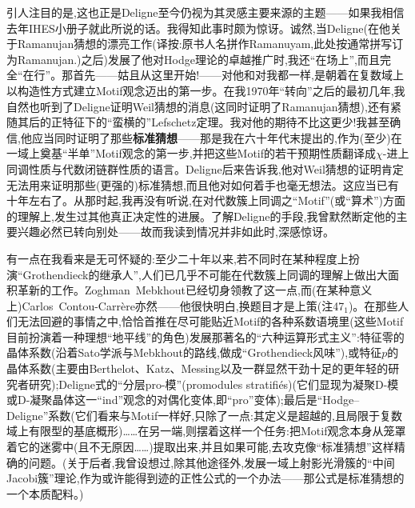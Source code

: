 引人注目的是,这也正是Deligne至今仍视为其灵感主要来源的主题——如果我相信去年IHES小册子就此所说的话。我得知此事时颇为惊讶。诚然,当Deligne(在他关于Ramanujan猜想的漂亮工作(译按:原书人名拼作Ramanuyam,此处按通常拼写订为Ramanujan.)之后)发展了他对Hodge理论的卓越推广时,我还“在场上”,而且完全“在行”。那首先——姑且从这里开始!——对他和对我都一样,是朝着在复数域上以构造性方式建立Motif观念迈出的第一步。在我1970年“转向”之后的最初几年,我自然也听到了Deligne证明Weil猜想的消息(这同时证明了Ramanujan猜想),还有紧随其后的正特征下的“蛮横的”Lefschetz定理。我对他的期待不比这更少!我甚至确信,他应当同时证明了那些\textbf{标准猜想}——那是我在六十年代末提出的,作为(至少)在一域上奠基“半单”Motif观念的第一步,并把这些Motif的若干预期性质翻译成$\chi$-进上同调性质与代数闭链群性质的语言。Deligne后来告诉我,他对Weil猜想的证明肯定无法用来证明那些(更强的)标准猜想,而且他对如何着手也毫无想法。这应当已有十年左右了。从那时起,我再没有听说,在对代数簇上同调之“Motif”(或“算术”)方面\dmark{}的理解上,发生过其他真正决定性的进展。了解Deligne的手段,我曾默然断定他的主要兴趣必然已转向别处——故而我读到情况并非如此时,深感惊讶。

有一点在我看来是无可怀疑的:至少二十年以来,若不同时在某种程度上扮演“Grothendieck的继承人”,人们已几乎不可能在代数簇上同调的理解上做出大面积革新的工作。Zoghman~Mebkhout已经切身领教了这一点,而(在某种意义上)Carlos~Contou-Carrère亦然——他很快明白,换题目才是上策(注47$_{1}$)。在那些人们无法回避的事情之中,恰恰首推在尽可能贴近Motif的各种系数语境里(这些Motif目前扮演着一种理想“地平线”的角色)发展那著名的“六种运算形式主义”:特征零的晶体系数(沿着Sato学派与Mebkhout的路线,做成“Grothendieck风味”),或特征$p$的晶体系数(主要由Berthelot、Katz、Messing以及一群显然干劲十足的更年轻的研究者研究);Deligne式的“分层pro-模”(promodules stratifiés)(它们显现为凝聚D-模或D-凝聚晶体这一“ind”观念的对偶化变体,即“pro”变体);最后是“Hodge--Deligne”系数(它们看来与Motif一样好,只除了一点:其定义是超越的,且局限于复数域上有限型的基底概形)……在另一端,则摆着这样一个任务:把Motif观念本身从笼罩着它的迷雾中(且不无原因……)提取出来,并且如果可能,去攻克像“标准猜想”这样精确的问题。(关于后者,我曾设想过,除其他途径外,发展一域上射影光滑簇的“中间Jacobi簇”理论,作为或许能得到迹的正性公式的一个办法——那公式是标准猜想的一个本质配料。)

